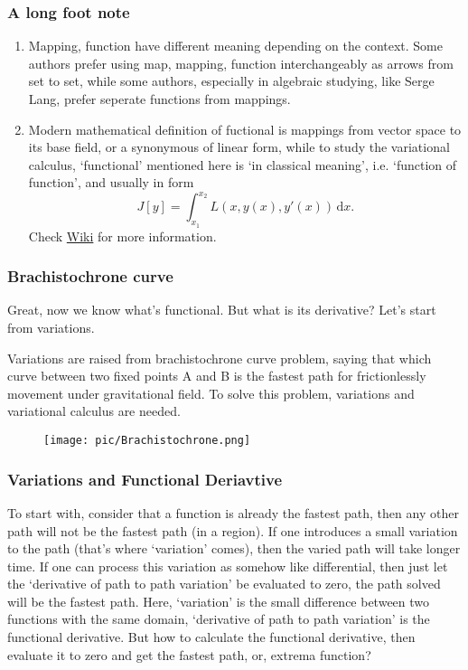 \documentclass[compress]{beamer}
\begin{document}
\begin{frame}
  \frametitle{A long foot note}
  \begin{enumerate}
    \item Mapping, function have different meaning depending on the context. Some authors prefer using map, mapping, function interchangeably as
          arrows from set to set, while some authors, especially in algebraic studying, like Serge Lang, prefer seperate functions from mappings.
    \item Modern mathematical definition of fuctional is mappings from vector space to its base field,
          or a synonymous of linear form, while to study the variational calculus, `functional' mentioned here is `in classical meaning', i.e. `function of function',
          and  usually in form \[J\left[ y \right]=\int_{x_1}^{x_2}L(x,y(x),y'(x)) \,\mathrm{d}x.\]
          Check \href{https://en.wikipedia.org/wiki/Functional_(mathematics)}{\color{blue}Wiki} for more information.
  \end{enumerate}
\end{frame}

\begin{frame}
  \frametitle{Brachistochrone curve}
  Great, now we know what's functional. But what is its derivative? Let's start from variations.

  Variations are raised from brachistochrone curve problem, saying that which curve between two fixed points A and B is
  the fastest path for frictionlessly movement under gravitational field. To solve this problem, variations and variational calculus are needed.
  \begin{figure}
    \centering
    \texttt{[image: pic/Brachistochrone.png]}
  \end{figure}
\end{frame}

\begin{frame}
  \frametitle{Variations and Functional Deriavtive}
  To start with, consider that a function is already the fastest path, then any other path will not be the fastest path (in a region). If one introduces a small
  variation to the path (that's where `variation' comes), then the varied path will take longer time. If one can process this variation as somehow like differential,
  then just let the `derivative of path to path variation' be evaluated to zero, the path solved will be the fastest path.
  \bigbreak
  Here, `variation' is the small difference between two functions with the same domain,
  `derivative of path to path variation' is the functional derivative.
  \bigbreak
  But how to calculate the functional derivative, then evaluate it to zero and get the fastest path, or, extrema function?
\end{frame}
\end{document}
